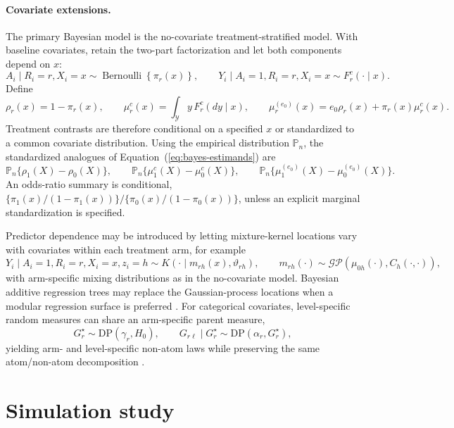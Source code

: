 \documentclass[11pt]{article}
\DeclareMathOperator*{\Bernoulli}{Bernoulli}
\begin{document}
\paragraph{Covariate extensions.}
The primary Bayesian model is the no-covariate treatment-stratified model. With baseline covariates, retain the two-part factorization and let both components depend on $x$:
\[
  A_i\mid R_i=r,X_i=x
  \sim \Bernoulli\!\left\{\pi_r(x)\right\},
  \qquad
  Y_i\mid A_i=1,R_i=r,X_i=x
  \sim F_r^c(\cdot\mid x).
\]
Define
\[
  \rho_r(x)=1-\pi_r(x),
  \qquad
  \mu_r^c(x)=\int_{\mathcal Y}y\,F_r^c(dy\mid x),
  \qquad
  \mu_r^{(e_0)}(x)=e_0\rho_r(x)+\pi_r(x)\mu_r^c(x).
\]
Treatment contrasts are therefore conditional on a specified $x$ or standardized to a common covariate distribution. Using the empirical distribution $\mathbb{P}_n$, the standardized analogues of Equation~(\ref{eq:bayes-estimands}) are
\[
  \mathbb{P}_n\{\rho_1(X)-\rho_0(X)\},
  \qquad
  \mathbb{P}_n\{\mu_1^c(X)-\mu_0^c(X)\},
  \qquad
  \mathbb{P}_n\{\mu_1^{(e_0)}(X)-\mu_0^{(e_0)}(X)\}.
\]
An odds-ratio summary is conditional, $\{\pi_1(x)/(1-\pi_1(x))\}/\{\pi_0(x)/(1-\pi_0(x))\}$, unless an explicit marginal standardization is specified.

Predictor dependence may be introduced by letting mixture-kernel locations vary with covariates within each treatment arm, for example
\[
  Y_i\mid A_i=1,R_i=r,X_i=x,z_i=h
  \sim K\!\left(\cdot\mid m_{rh}(x),\vartheta_{rh}\right),
  \qquad
  m_{rh}(\cdot)\sim\mathcal{GP}\!\left(\mu_{0h}(\cdot),C_h(\cdot,\cdot)\right),
\]
with arm-specific mixing distributions as in the no-covariate model. Bayesian additive regression trees may replace the Gaussian-process locations when a modular regression surface is preferred \citep{chipman2010bart}. For categorical covariates, level-specific random measures can share an arm-specific parent measure,
\[
  G_r^\star\sim\mathrm{DP}(\gamma_r,H_0),
  \qquad
  G_{r\ell}\mid G_r^\star\sim\mathrm{DP}(\alpha_r,G_r^\star),
\]
yielding arm- and level-specific non-atom laws while preserving the same atom/non-atom decomposition \citep{maceachern1999dependent,gelfand2005bayesian,rasmussen2006gaussian,teh2006hierarchical,deiorio2004anova}.








\section{Simulation study}\label{sec:simulation-study}
\end{document}
